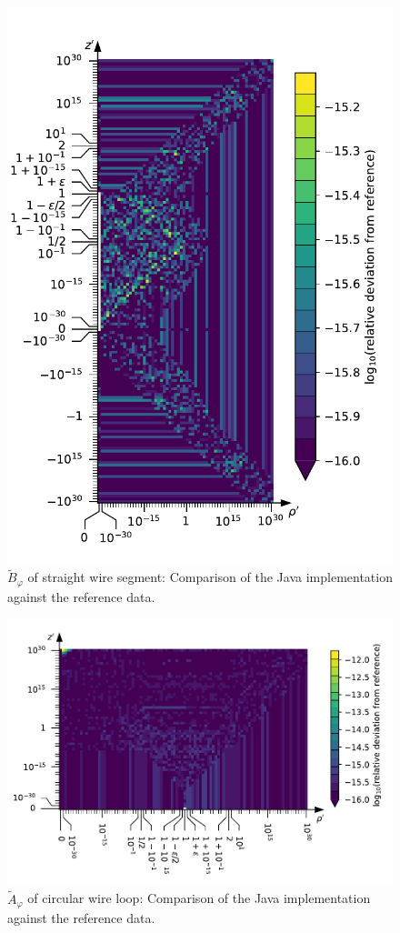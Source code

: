 \begin{figure}[htbp]
 \centering
 \includegraphics{img/StraightWireSegment_B_phi_Java.pdf}
 \caption{$\tilde{B}_\varphi$ of straight wire segment: Comparison of the Java implementation against the reference data.}
 \label{fig:StraightWireSegment_B_phi_Java}
\end{figure}


\begin{figure}[htbp]
 \centering
 \includegraphics{img/CircularWireLoop_A_phi_Java.pdf}
 \caption{$\tilde{A}_\varphi$ of circular wire loop: Comparison of the Java implementation against the reference data.}
 \label{fig:CircularWireLoop_A_phi_Java}
\end{figure}

